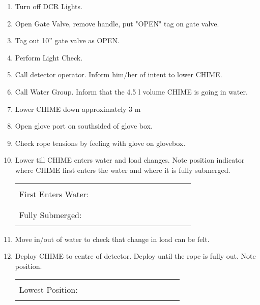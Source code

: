 \begin{enumerate}
\item\checkbox Turn off DCR Lights.  
  
\item\checkbox Open Gate Valve, remove handle, put "OPEN" tag on gate valve.
 
\item\checkbox Tag out 10'' gate valve as OPEN.
 
\item\checkbox Perform Light Check.
  
\item\checkbox Call detector operator.  Inform him/her of intent to  lower CHIME.
 
\item\checkbox Call Water Group.  Inform that the 4.5 l volume CHIME is going in
               water.
  
\item\checkbox Lower CHIME down approximately 3 m
  
\item\checkbox Open glove port on southsided of glove box.

\item\checkbox Check rope tensions by feeling with glove on glovebox.
  
\item\checkbox Lower till CHIME enters water and  load changes.
     Note position indicator where CHIME first enters the water and
     where it is fully submerged.
     \begin{center}
     \begin{tabular}{|l|}
     \hline
      \\
     First Enters Water:~~~~~~~~~~~~~~~~~~~~~~~~\\
      \\
     \hline
      \\
     Fully Submerged:~~~~~~~~~~~~~~~~~~~~~~~~\\
      \\
     \hline
     \end{tabular}
     \end{center}

  
\item\checkbox Move in/out of water to check that change in load can be felt.
  
\item\checkbox Deploy CHIME to centre of detector.  Deploy until
  the rope is fully out.  Note position.
     \begin{center}
     \begin{tabular}{|l|}
     \hline
      \\
     Lowest Position:~~~~~~~~~~~~~~~~~~~~~~~~\\
      \\
     \hline
     \end{tabular}
     \end{center}


\end{enumerate}
